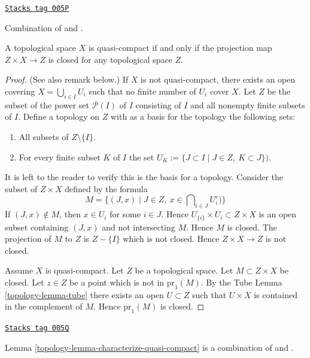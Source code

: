 \begin{lemma}
\label{topology-lemma-characterize-quasi-compact}
\href{https://stacks.math.columbia.edu/tag/005P}{\texttt{Stacks tag 005P}}

\begin{reference}
Combination of
\cite[I, p. 75, Lemme 1]{Bourbaki} and
\cite[I, p. 76, Corrolaire 1]{Bourbaki}.
\end{reference}
A topological space $X$ is quasi-compact if and only if the
projection map $Z \times X \to Z$ is closed for
any topological space $Z$.
\end{lemma}

\begin{proof}

(See also remark below.)
If $X$ is not quasi-compact, there exists an open covering
$X = \bigcup_{i \in I} U_i$ such that no finite
number of $U_i$ cover $X$.
Let $Z$ be the subset of the power set $\mathcal{P}(I)$ of $I$
consisting of $I$ and all nonempty finite subsets of $I$.
Define a topology on $Z$ with as a basis for the topology
the following sets:
\begin{enumerate}
\item All subsets of $Z\setminus\{I\}$.
\item For every finite subset $K$ of $I$ the set
$U_K := \{J\subset I \mid J \in Z, \ K\subset J \})$.
\end{enumerate}
It is left to the reader to verify this is the basis for a topology.
Consider the subset of $Z \times X$ defined by the formula
$$
M = \{(J, x) \mid J \in Z, \ x \in \bigcap\nolimits_{i \in J} U_i^c)\}
$$
If $(J, x) \not \in M$, then $x \in U_i$ for some $i \in J$.
Hence $U_{\{i\}} \times U_i \subset Z \times X$ is an open
subset containing $(J, x)$ and not intersecting $M$. Hence
$M$ is closed. The projection of $M$ to $Z$ is $Z-\{I\}$
which is not closed. Hence $Z \times X \to Z$ is not closed.

\medskip\noindent
Assume $X$ is quasi-compact. Let $Z$ be a topological space.
Let $M \subset  Z \times X$ be closed. Let $z \in Z$ be a point
which is not in $\text{pr}_1(M)$. By the Tube Lemma \ref{topology-lemma-tube}
there exists an open $U \subset Z$ such that $U \times X$ is
contained in the complement of $M$. Hence $\text{pr}_1(M)$ is closed.
\end{proof}

\begin{remark}
\label{topology-remark-lemma-literature}
\href{https://stacks.math.columbia.edu/tag/005Q}{\texttt{Stacks tag 005Q}}

Lemma \ref{topology-lemma-characterize-quasi-compact} is a combination of
\cite[I, p. 75, Lemme 1]{Bourbaki} and
\cite[I, p. 76, Corollaire 1]{Bourbaki}.
\end{remark}

